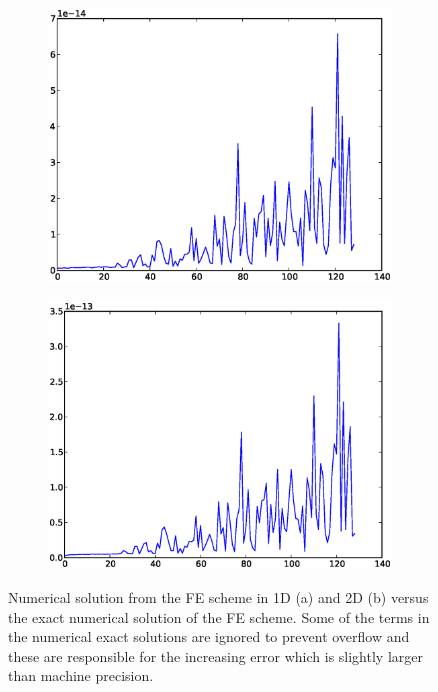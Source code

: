 \begin{figure}[H]
 \centering
 \begin{subfigure}{0.49\textwidth}
 \includegraphics[width=\textwidth]{Figures/exact_numerical_1d_n130.eps}
  \caption{}
  \label{numerical_exact_FE:1D}
 \end{subfigure}
 \begin{subfigure}{0.49\textwidth}
 \includegraphics[width=\textwidth]{Figures/exact_numerical_2d_n130.eps}
  \caption{}
  \label{numerical_exact_FE:2D}
 \end{subfigure}
 \caption[Numerical exact error plots FE]{Numerical solution from the FE scheme in 1D (a) and 2D (b) versus the exact numerical solution of the FE scheme.
 Some of the terms in the numerical exact solutions are ignored to prevent overflow and these are responsible for the increasing error which is slightly larger than machine precision.}
 \label{numerical_exact_FE}
\end{figure}


